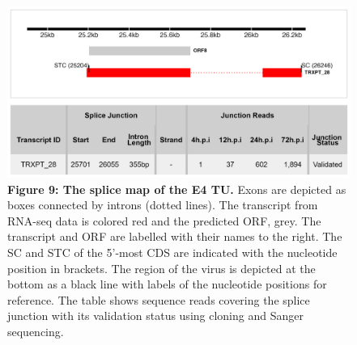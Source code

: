 \documentclass[
]{article}
\begin{document}
\begin{figure}
\centering
\includegraphics{results/r/figures/figure9.png}
\caption{\textbf{Figure 9: The splice map of the E4 TU.} Exons are
depicted as boxes connected by introns (dotted lines). The transcript
from RNA-seq data is colored red and the predicted ORF, grey. The
transcript and ORF are labelled with their names to the right. The SC
and STC of the 5'-most CDS are indicated with the nucleotide position in
brackets. The region of the virus is depicted at the bottom as a black
line with labels of the nucleotide positions for reference. The table
shows sequence reads covering the splice junction with its validation
status using cloning and Sanger sequencing.}
\end{figure}

\newpage
\end{document}
